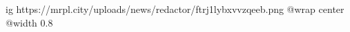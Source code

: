  
 
 
 
 

\ifcmt
  ig https://mrpl.city/uploads/news/redactor/ftrj1lybxvvzqeeb.png
  @wrap center
  @width 0.8
\fi
